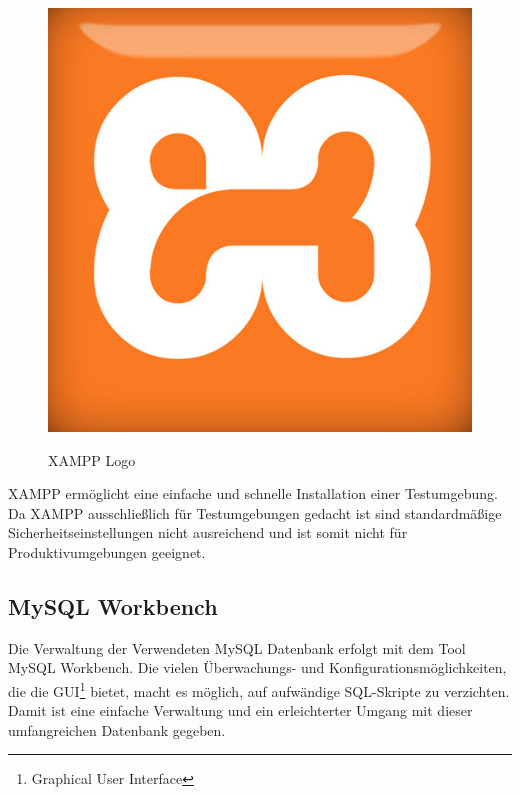 	\begin{figure}
		\vspace{-1cm}
		\begin{center}
			\caption{XAMPP Logo}
			\vspace{.5cm}
			\includegraphics[scale=.2]{figures/xampp_logo.jpg}
			
			\label{XAMPP_Logo}
		\end{center}
	\end{figure}

	\newpage
	XAMPP ermöglicht eine einfache und schnelle Installation einer Testumgebung. Da XAMPP ausschließlich für Testumgebungen gedacht ist sind standardmäßige Sicherheitseinstellungen nicht ausreichend und ist somit nicht für Produktivumgebungen geeignet.
	
	
	\subsection{MySQL Workbench}
	Die Verwaltung der Verwendeten MySQL Datenbank erfolgt mit dem Tool MySQL Workbench. Die vielen Überwachungs- und Konfigurationsmöglichkeiten, die die GUI\footnote{Graphical User Interface} bietet, macht es möglich, auf aufwändige SQL-Skripte zu verzichten. Damit ist eine einfache Verwaltung und ein erleichterter Umgang mit dieser umfangreichen Datenbank gegeben.
	
